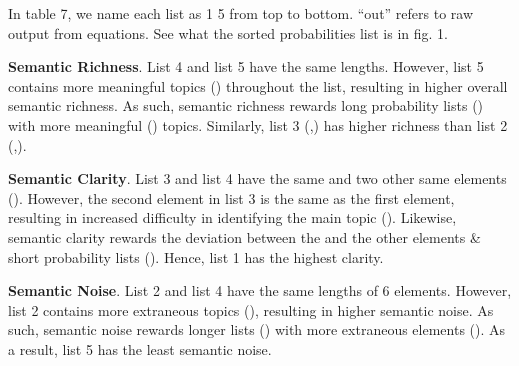 \documentclass[11pt]{article}
\begin{document}
In table 7, we name each list as 1  5 from top to bottom. ``out'' refers to raw output from equations. See what the sorted probabilities list is in fig. 1.

\textbf{Semantic Richness}. List 4  and list 5 have the same lengths. However, list 5 contains more meaningful topics () throughout the list, resulting in higher overall semantic richness. As such, semantic richness rewards long probability lists () with more meaningful () topics. Similarly, list 3 (,) has higher richness than list 2 (,).

\textbf{Semantic Clarity}. List 3 and list 4 have the same  and two other same elements (). However, the second element in list 3 is the same as the first element, resulting in increased difficulty in identifying the main topic (). Likewise, semantic clarity rewards the deviation between the  and the other elements \& short probability lists (). Hence, list 1 has the highest clarity.

\textbf{Semantic Noise}. List 2 and list 4 have the same lengths of 6 elements. However, list 2 contains more extraneous topics (), resulting in higher semantic noise. As such, semantic noise rewards longer lists () with more extraneous elements (). As a result, list 5 has the least semantic noise.
\end{document}
